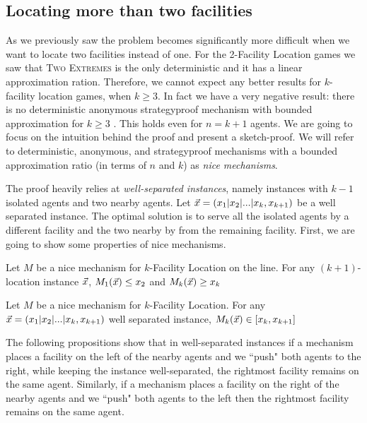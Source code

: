 \subsection{Locating more than two facilities}

As we previously saw the problem becomes significantly more difficult when we want to locate two facilities instead of one. For the 2-Facility Location games we saw that \textsc{Two Extremes} is the only deterministic and it has a linear approximation ration. Therefore, we cannot expect any better results for $k$-facility location games, when $k\ge3$. In fact we have a very negative result: there is no deterministic anonymous strategyproof mechanism with bounded approximation for $k\ge3$ \cite{Fotakis2014}. This holds even for $n=k+1$ agents. We are going to focus on the intuition behind the proof and present a sketch-proof.  We will refer to deterministic, anonymous, and strategyproof mechanisms with a bounded approximation ratio (in terms of $n$ and $k$) as \emph{nice mechanisms}.



The proof heavily relies at \emph{well-separated instances}, namely instances with $k-1$ isolated agents and two nearby agents. Let $\vec{x} = (x_1|x_2|...|x_k, x_{k+1})$ be a well separated instance. The optimal solution is to serve all the isolated agents by a different facility and the two nearby by from the remaining facility. First, we are going to show some properties of nice mechanisms. 



\begin{proposition}
Let $M$ be a nice mechanism for $k$-Facility Location on the line. For any $(k+1)$-location instance $\vec{x}$, $M_1(\vec{x}) \le x_2$ and $M_k(\vec{x})\ge x_k$
\end{proposition}


\begin{proposition}
Let $M$ be a nice mechanism for $k$-Facility Location. For any $\vec{x}=(x_1|x_2|...|x_k,x_{k+1})$ well separated instance, $M_k(\vec{x}) \in [x_k,x_{k+1}]$
\end{proposition}

The following propositions show that in well-separated instances if a mechanism places a facility on the left of the nearby agents and we ``push" both agents to the right, while keeping the instance well-separated, the rightmost facility remains on the same agent. Similarly, if a mechanism places a facility on the right of the nearby agents and we ``push" both agents to the left then the rightmost facility remains on the same agent. 

